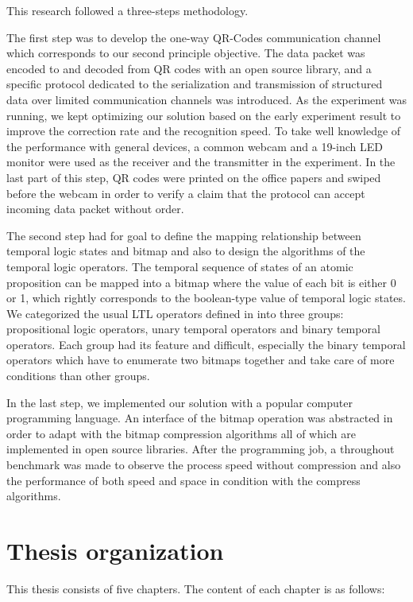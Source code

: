 This research followed a three-steps methodology.

The first step was to develop the one-way QR-Codes communication channel which corresponds to our second principle objective. The data packet was encoded to and decoded from QR codes with an open source library, and a specific protocol dedicated to the serialization and transmission of structured data over limited communication channels was introduced. As the experiment was running, we kept optimizing our solution based on the early experiment result to improve the correction rate and the recognition speed. To take well knowledge of the performance with general devices, a common webcam and a 19-inch LED monitor were used as the receiver and the transmitter in the experiment. In the last part of this step, QR codes were printed on the office papers and swiped before the webcam in order to verify a claim that the protocol can accept incoming data packet without order.

The second step had for goal to define the mapping relationship between temporal logic states and bitmap and also to design the algorithms of the temporal logic operators. The temporal sequence of states of an atomic proposition can be mapped into a bitmap where the value of each bit is either 0 or 1, which rightly corresponds to the boolean-type value of temporal logic states. We categorized the usual LTL operators defined in \cite{huth2004} into three groups: propositional logic operators, unary temporal operators and binary temporal operators. Each group had its feature and difficult, especially the binary temporal operators which have to enumerate two bitmaps together and take care of more conditions than other groups.

In the last step, we implemented our solution with a popular computer programming language. An interface of the bitmap operation was abstracted in order to adapt with the bitmap compression algorithms all of which are implemented in open source libraries. After the programming job, a throughout benchmark was made to observe the process speed without compression and also the performance of both speed and space in condition with the compress algorithms.

\section{Thesis organization}

This thesis consists of five chapters. The content of each chapter is as follows:

